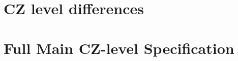 \documentclass{article}
\begin{document}
\section{CZ level differences}




\section{Full Main CZ-level Specification}
\begin{landscape}


\end{landscape}



\end{document}
